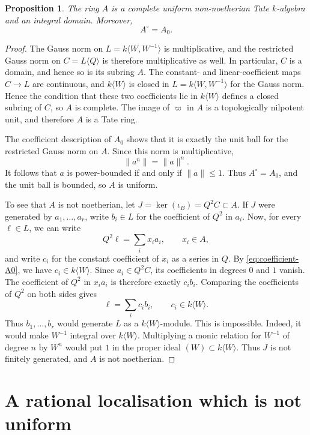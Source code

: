 \documentclass[11pt,reqno]{amsart}
\newtheorem{proposition}[proposition]{Proposition}
\theoremstyle{definition}
\begin{document}
\begin{proposition}\label{prop:uniform-domain}
The ring $A$ is a complete uniform non-noetherian Tate $k$-algebra and an
integral domain.  Moreover,
\[
  A^\circ=A_0.
\]
\end{proposition}

\begin{proof}
The Gauss norm on $L=k\langle W,W^{-1}\rangle$ is multiplicative, and the
restricted Gauss norm on $C=L\langle Q\rangle$ is therefore multiplicative as
well.  In particular, $C$ is a domain, and hence so is its subring $A$.  The
constant- and linear-coefficient maps $C\to L$ are continuous, and
$k\langle W\rangle$ is closed in $L=k\langle W,W^{-1}\rangle$ for the Gauss
norm.  Hence the condition that these two coefficients lie in
$k\langle W\rangle$ defines a closed subring of $C$, so $A$ is complete.  The
image of $\varpi$ in $A$ is a topologically nilpotent unit, and therefore $A$
is a Tate ring.

The coefficient description of $A_0$ shows that it is exactly the unit ball
for the restricted Gauss norm on $A$.  Since this norm is multiplicative,
\[
  \lVert a^n\rVert=\lVert a\rVert^n.
\]
It follows that $a$ is power-bounded if and only if $\lVert a\rVert\leq1$.
Thus $A^\circ=A_0$, and the unit ball is bounded, so $A$ is uniform.

To see that $A$ is not noetherian, let $J=\ker(\iota_B)=Q^2C\subset A$.  If $J$ were
generated by $a_1,\ldots,a_r$, write $b_i\in L$ for the coefficient of $Q^2$
in $a_i$.  Now, for every $\ell\in L$, we can write
\[
  Q^2\ell=\sum_i x_i a_i,\qquad x_i\in A,
\]
and write $c_i$ for the constant coefficient of $x_i$ as a series in $Q$.
By \eqref{eq:coefficient-A0}, we have $c_i\in k\langle W\rangle$.  Since
$a_i\in Q^2C$, its coefficients in degrees $0$ and $1$ vanish.  The
coefficient of $Q^2$ in $x_i a_i$ is therefore exactly $c_i b_i$.
Comparing the coefficients of $Q^2$ on both sides gives
\[
  \ell=\sum_i c_i b_i,\qquad c_i\in k\langle W\rangle.
\]
Thus $b_1,\ldots,b_r$ would generate $L$ as a
$k\langle W\rangle$-module.  This is impossible.  Indeed, it would make
$W^{-1}$ integral over $k\langle W\rangle$.  Multiplying a monic relation for
$W^{-1}$ of degree $n$ by $W^n$ would put $1$ in the proper ideal
$(W)\subset k\langle W\rangle$.  Thus $J$ is not finitely generated, and $A$
is not noetherian.
\end{proof}


\section{A rational localisation which is not uniform}
\end{document}
